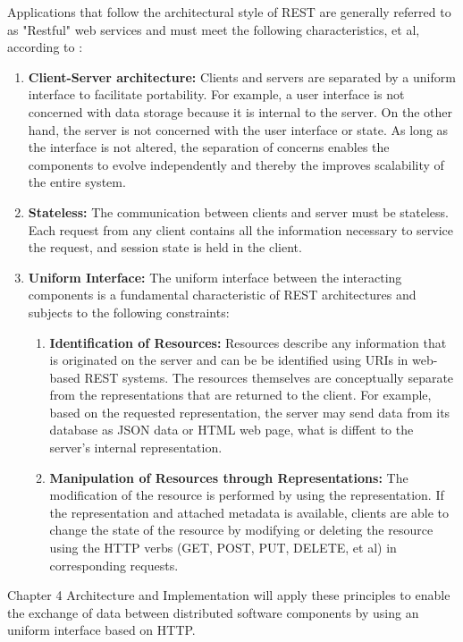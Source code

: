 Applications that follow the architectural style of REST are generally referred to as "Restful" web services and must meet
the following characteristics, et al, according to \cite{Field00}:
\begin{enumerate}
    \item \textbf{Client-Server architecture:}
    Clients and servers are separated by a uniform interface to facilitate portability. For example, a user interface
    is not concerned with data storage because it is internal to the server. On the other hand, the server is not concerned
    with the user interface or state. As long as the interface is not altered, the separation of concerns enables the
    components to evolve independently and thereby the improves scalability of the entire system.
    \item \textbf{Stateless:}
    The communication between clients and server must be stateless. Each request from any client contains all the
    information necessary to service the request, and session state is held in the client.
    \item \textbf{Uniform Interface:}
    The uniform interface between the interacting components is a fundamental characteristic of REST architectures and subjects
    to the following constraints:
    \begin{enumerate}
        \item \textbf{Identification of Resources:}
        Resources describe any information that is originated on the server and can be be identified using URIs in web-based
        REST systems. The resources themselves are conceptually separate from the representations that are returned to the client.
        For example, based on the requested representation, the server may send data from its database as JSON data or HTML web
        page, what is diffent to the server's internal representation.
        \item \textbf{Manipulation of Resources through Representations:}
        The modification of the resource is performed by using the representation. If the representation and attached metadata
        is available, clients are able to change the state of the resource by modifying or deleting the resource using the
        HTTP verbs (GET, POST, PUT, DELETE, et al) in corresponding requests.
    \end{enumerate}
\end{enumerate}

Chapter 4 Architecture and Implementation will apply these principles to enable the exchange of data between distributed
software components by using an uniform interface based on HTTP.

